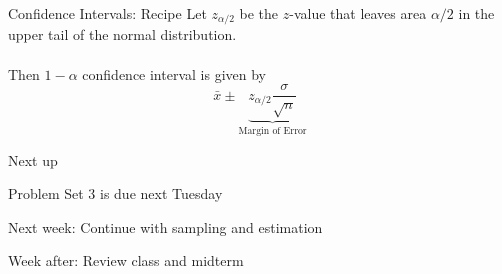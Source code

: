 \documentclass{./../div_teaching_slides}
\begin{document}
\begin{frame}{Confidence Intervals: Recipe}
Let $z_{\alpha/2}$ be the $z$-value that leaves area $\alpha/2$ in the upper tail of the normal distribution. \\~\\
Then $1-\alpha$ confidence interval is given by 
$$ \bar{x} \pm  \underbrace{z_{\alpha/2}  \frac{\sigma}{\sqrt{n}}}_{\text{Margin of Error}} $$
\end{frame}

\begin{frame}{Next up}
\begin{witemize}
  \item Problem Set 3 is due next Tuesday 
  \item Next week: Continue with sampling and estimation
  \item Week after: Review class and midterm 
\end{witemize}
\end{frame}
\end{document}

